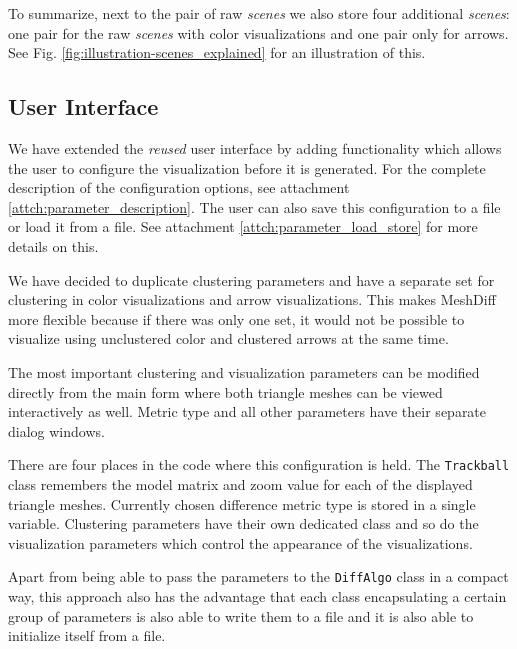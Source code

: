 To summarize, next to the pair of raw {\it scenes} we also store four additional {\it scenes}: one pair for the raw {\it scenes} with color visualizations and one pair only for arrows. See Fig. \ref{fig:illustration-scenes_explained} for an illustration of this.

\subsection{User Interface}
\label{subsec:implementation-architecture-user_interface}

We have extended the {\it reused} user interface by adding functionality which allows the user to configure the visualization before it is generated. For the complete description of the configuration options, see attachment \ref{attch:parameter_description}. The user can also save this configuration to a file or load it from a file. See attachment \ref{attch:parameter_load_store} for more details on this.

We have decided to duplicate clustering parameters and have a separate set for clustering in color visualizations and arrow visualizations. This makes MeshDiff more flexible because if there was only one set, it would not be possible to visualize using unclustered color and clustered arrows at the same time.

The most important clustering and visualization parameters can be modified directly from the main form where both triangle meshes can be viewed interactively as well. Metric type and all other parameters have their separate dialog windows.

There are four places in the code where this configuration is held. The \verb+Trackball+ class remembers the model matrix and zoom value for each of the displayed triangle meshes. Currently chosen difference metric type is stored in a single variable. Clustering parameters have their own dedicated class and so do the visualization parameters which control the appearance of the visualizations.

Apart from being able to pass the parameters to the \verb+DiffAlgo+ class in a compact way, this approach also has the advantage that each class encapsulating a certain group of parameters is also able to write them to a file and it is also able to initialize itself from a file\footnotemark.


